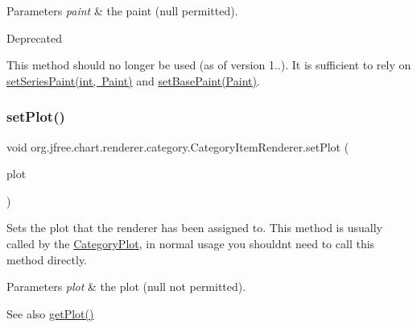 \begin{DoxyParams}{Parameters}
{\em paint} & the paint ({\ttfamily null} permitted).\\
\hline
\end{DoxyParams}
\begin{DoxyRefDesc}{Deprecated}
\item[\mbox{\hyperlink{deprecated__deprecated000159}{Deprecated}}]This method should no longer be used (as of version 1..). It is sufficient to rely on \mbox{\hyperlink{interfaceorg_1_1jfree_1_1chart_1_1renderer_1_1category_1_1_category_item_renderer_a5e1be0451c25f554cca76cceaa5a3785}{set\+Series\+Paint(int, Paint)}} and \mbox{\hyperlink{interfaceorg_1_1jfree_1_1chart_1_1renderer_1_1category_1_1_category_item_renderer_a077f331549f2d9a83380ad763d03f3a6}{set\+Base\+Paint(\+Paint)}}. \end{DoxyRefDesc}
\mbox{\label{interfaceorg_1_1jfree_1_1chart_1_1renderer_1_1category_1_1_category_item_renderer_a21871e4d309e252c004b96b93914bbc2}} 
\subsubsection{\texorpdfstring{set\+Plot()}{setPlot()}}
{\footnotesize\ttfamily void org.\+jfree.\+chart.\+renderer.\+category.\+Category\+Item\+Renderer.\+set\+Plot (\begin{DoxyParamCaption}\item[{\mbox{\hyperlink{classorg_1_1jfree_1_1chart_1_1plot_1_1_category_plot}{Category\+Plot}}}]{plot }\end{DoxyParamCaption})}

Sets the plot that the renderer has been assigned to. This method is usually called by the \mbox{\hyperlink{}{Category\+Plot}}, in normal usage you shouldn\textquotesingle{}t need to call this method directly.


\begin{DoxyParams}{Parameters}
{\em plot} & the plot ({\ttfamily null} not permitted).\\
\hline
\end{DoxyParams}
\begin{DoxySeeAlso}{See also}
\mbox{\hyperlink{interfaceorg_1_1jfree_1_1chart_1_1renderer_1_1category_1_1_category_item_renderer_a4e97e71b2fb7754a580bf9c29312a9db}{get\+Plot()}} 
\end{DoxySeeAlso}


